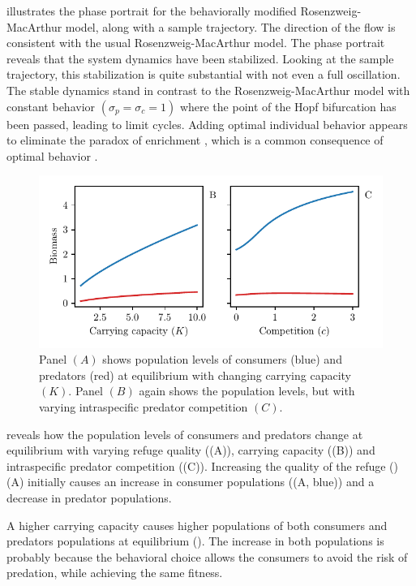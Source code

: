  illustrates the phase portrait for the behaviorally modified Rosenzweig-MacArthur model, along with a sample trajectory. The direction of the flow is consistent with the usual Rosenzweig-MacArthur model. The phase portrait reveals that the system dynamics have been stabilized. Looking at the sample trajectory, this stabilization is quite substantial with not even a full oscillation. The stable dynamics stand in contrast to the Rosenzweig-MacArthur model with constant behavior $(\sigma_p=\sigma_c=1)$ where the point of the Hopf bifurcation has been passed, leading to limit cycles. Adding optimal individual behavior appears to eliminate the paradox of enrichment \citep{rosenzweig1971paradox}, which is a common consequence of optimal behavior \citep{abrams2010implications}.
\begin{figure}[H]
  \caption{Panel $(A)$ shows population levels of consumers (blue) and predators (red) at equilibrium with changing carrying capacity $(K)$. Panel $(B)$ again shows the population levels, but with varying intraspecific predator competition $(C)$.}
  \label{fig:pop_levels}
  \includegraphics{plots/pop_levels_c.pdf}
\end{figure}
 reveals how the population levels of consumers and predators change at equilibrium with varying refuge quality ((A)), carrying capacity ((B)) and intraspecific predator competition ((C)).
Increasing the quality of the refuge ()(A) initially causes an increase in consumer populations ((A, blue)) and a decrease in predator populations.

A higher carrying capacity causes higher populations of both consumers and predators populations at equilibrium (). The increase in both populations is probably because the behavioral choice allows the consumers to avoid the risk of predation, while achieving the same fitness.

